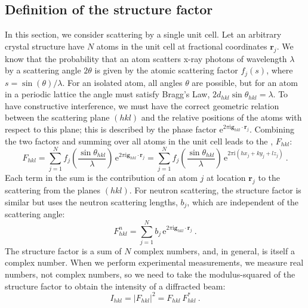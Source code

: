 \subsection{Definition of the structure factor}\label{\chabbr:ssec:SFdef}
In this section, we consider scattering by a single unit cell.  Let an arbitrary crystal structure have $N$ atoms in the unit cell at fractional coordinates $\mathbf{r}_j$.  We know that the probability that an atom scatters x-ray photons of wavelength $\lambda$ by a scattering angle $2\theta$ is given by the atomic scattering factor $f_j(s)$, where $s=\sin(\theta)/\lambda$.  For an isolated atom, all angles $\theta$ are possible, but for an atom in a periodic lattice the angle must satisfy Bragg's Law, $2d_{hkl}\sin\theta_{hkl}=\lambda$.  To have constructive interference, we must have the correct geometric relation between the scattering plane $(hkl)$ and the relative positions of the atoms with respect to this plane; this is described by the phase factor $\mathrm{e}^{2\pi\mathrm{i}\mathbf{g}_{hkl}\cdot\mathbf{r}_j}$.  Combining the two factors and summing over all atoms in the unit cell leads to the , $F_{hkl}$:
\begin{equation}
	F_{hkl} = \sum_{j=1}^{N} f_j\left(\frac{\sin\theta_{hkl}}{\lambda}\right)\,\mathrm{e}^{2\pi\mathrm{i}\mathbf{g}_{hkl}\cdot\mathbf{r}_j}
	= \sum_{j=1}^{N} f_j\left(\frac{\sin\theta_{hkl}}{\lambda}\right)\,\mathrm{e}^{2\pi\mathrm{i}(hx_j+ky_j+lz_j)}\ .\label{\chabbr:eq:StructureFactor}
\end{equation}
Each term in the sum is the contribution of an atom $j$ at location $\mathbf{r}_j$ to the scattering from the planes $(hkl)$.  For neutron scattering, the structure factor is similar but uses the neutron scattering lengths, $b_j$, which are independent of the scattering angle:
\begin{equation}
	F^n_{hkl} = \sum_{j=1}^{N} b_j\,\mathrm{e}^{2\pi\mathrm{i}\mathbf{g}_{hkl}\cdot\mathbf{r}_j}\ .\label{\chabbr:eq:StructureFactorNeutron}
\end{equation}
The structure factor is a sum of $N$ complex numbers, and, in general, is itself a complex number.  When we perform experimental measurements, we measure real numbers, not complex numbers, so we need to take the modulus-squared of the structure factor to obtain the intensity of a diffracted beam:
\begin{equation}
	I_{hkl} = \vert F_{hkl}\vert^2 = F_{hkl}\,F^{\ast}_{hkl}\ .\label{\chabbr:eq:Intensity}
\end{equation}


